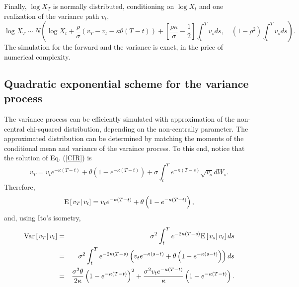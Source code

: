 \documentclass[12pt]{article}
\begin{document}
    Finally, $\log X_T$ is normally distributed, conditioning on $\log X_t$ and one realization of the variance path $v_t$,
    \begin{equation}
      \log X_T \sim N\left(\log X_t + \frac{\rho}{\sigma}\left(v_T-v_t-\kappa\theta(T-t) \right)
                    + \left[\frac{\rho\kappa}{\sigma}- \frac{1}{2}\right]\int_t^Tv_sds, \quad (1-\rho^2)\int_t^Tv_sds\right).
    \end{equation}
    The simulation for the forward and the variance is exact, in the price of numerical complexity.

  \subsection{Quadratic exponential scheme for the variance process \cite{Andersen}}

    The variance process can be efficiently simulated with approximation of the non-central chi-squared distribution, depending on the non-centraliy
    parameter. The approximated distribution can be determined by matching the moments of the conditional mean and variance of the varaince process.
    To this end, notice that the solution of Eq. (\ref{CIR}) is
    \begin{equation}
      v_T=v_te^{-\kappa(T-t)}+\theta\left(1-e^{-\kappa(T-t)}\right)+\sigma\int_t^Te^{-\kappa(T-s)}\sqrt{v_s}dW_s.
    \end{equation}
    Therefore,
    \begin{equation}
      {\rm E}\left[\left. v_T\right|v_t\right] = v_te^{-\kappa(T-t)}+\theta\left(1-e^{-\kappa(T-t)}\right),
    \end{equation}
    and, using Ito's isometry,
    \begin{eqnarray}
      {\rm Var}\left[\left. v_T\right|v_t\right] &=& \sigma^2\int_t^Te^{-2\kappa(T-s)}{\rm E}\left[\left. v_s\right|v_t\right]ds \nonumber\\
                &=& \sigma^2\int_t^Te^{-2\kappa(T-s)}\left(v_te^{-\kappa(s-t)}+\theta\left(1-e^{-\kappa(s-t)}\right)\right)ds \nonumber\\
                &=& \frac{\sigma^2\theta}{2\kappa}\left(1-e^{-\kappa(T-t)}\right)^2 + \frac{\sigma^2v_te^{-\kappa(T-t)}}{\kappa}\left(1-e^{-\kappa(T-t)}\right).
    \end{eqnarray}
\end{document}
